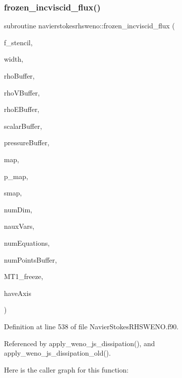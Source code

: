 \subsubsection{\texorpdfstring{frozen\+\_\+incviscid\+\_\+flux()}{frozen\_incviscid\_flux()}}
{\footnotesize\ttfamily subroutine navierstokesrhsweno\+::frozen\+\_\+incviscid\+\_\+flux (\begin{DoxyParamCaption}\item[{real(kind=8), dimension(\hyperlink{namespacenavierstokesrhsweno_af00ac01da0553acc8e7382cfc4a5ca1b}{width},numequations)}]{f\+\_\+stencil,  }\item[{integer(kind=4)}]{width,  }\item[{real(kind=8), dimension(numpointsbuffer), intent(in)}]{rho\+Buffer,  }\item[{real(kind=8), dimension(numdim$\ast$numpointsbuffer), intent(in), target}]{rho\+V\+Buffer,  }\item[{real(kind=8), dimension(numpointsbuffer), intent(in)}]{rho\+E\+Buffer,  }\item[{real(kind=8), dimension(nauxvars$\ast$numpointsbuffer), intent(in), target}]{scalar\+Buffer,  }\item[{real(kind=8), dimension(numpointsbuffer), intent(in)}]{pressure\+Buffer,  }\item[{integer(kind=4)}]{map,  }\item[{integer(kind=8), dimension(\+:)}]{p\+\_\+map,  }\item[{real(kind=8), dimension(\+:,\+:)}]{smap,  }\item[{integer(kind=4)}]{num\+Dim,  }\item[{integer(kind=4)}]{naux\+Vars,  }\item[{integer(kind=4)}]{num\+Equations,  }\item[{integer(kind=8)}]{num\+Points\+Buffer,  }\item[{real(kind=8), dimension(numdim), intent(in)}]{M\+T1\+\_\+freeze,  }\item[{integer(kind=4)}]{have\+Axis }\end{DoxyParamCaption})}



Definition at line 538 of file Navier\+Stokes\+R\+H\+S\+W\+E\+N\+O.\+f90.



Referenced by apply\+\_\+weno\+\_\+js\+\_\+dissipation(), and apply\+\_\+weno\+\_\+js\+\_\+dissipation\+\_\+old().

Here is the caller graph for this function\+:
\hypertarget{namespacenavierstokesrhsweno_a31b872df779e6dca9565827209290ac4}{}\label{namespacenavierstokesrhsweno_a31b872df779e6dca9565827209290ac4} 
